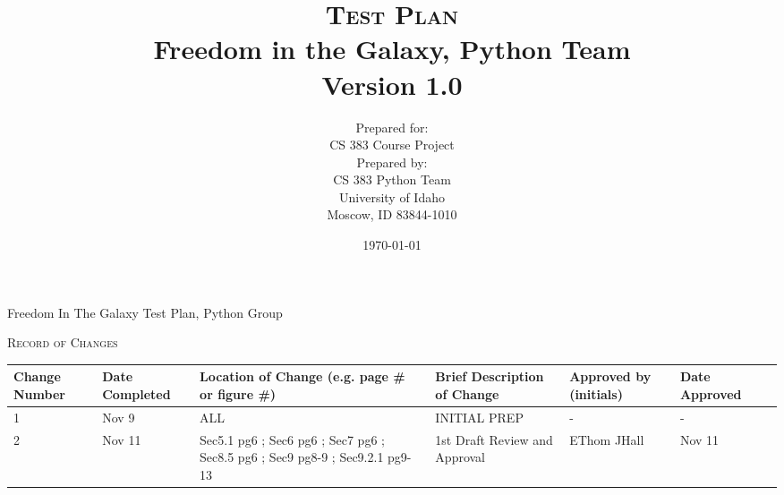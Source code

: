 \documentclass[report]{article}
\begin{document}
\title{\textsc{Test Plan}
  \\ Freedom in the Galaxy, Python Team
  \vspace{10 mm}
  \\ Version 1.0
  \vspace{10 mm}}
  
\date{\today}

\author{Prepared for:
  \\ CS 383 Course Project
  \vspace{10 mm}
  \\Prepared by:
  \\ CS 383 Python Team
  \\ University of Idaho
  \\ Moscow, ID 83844-1010
  \vspace{10 mm}}


\maketitle
\newpage 

\begin{center}
\noindent Freedom In The Galaxy Test Plan, Python Group

\vspace{10 mm}

\noindent \textsc{Record of Changes}   

\vspace{10 mm}


\begin{tabularx}{\textwidth}{| X | X | X | X | X | X | X |}
  \hline
  \textbf{Change Number} &
    \textbf{Date Completed} &
    \textbf{Location of Change (e.g. page \# or figure \#)} &
    \textbf{Brief Description of Change} &
    \textbf{Approved by (initials)} &
    \textbf{Date Approved} 
    \\ \hline 1 & Nov 9 & ALL  & INITIAL PREP & - & -
    \\ \hline 2 & Nov 11 & Sec5.1 pg6 ; Sec6 pg6 ; Sec7 pg6 ; Sec8.5 pg6 ; Sec9 pg8-9 ; Sec9.2.1 pg9-13 & 1st Draft Review and Approval & EThom JHall & Nov 11  

    \\ \hline
\end{tabularx}
\end{center}
\newpage 
\tableofcontents
\newpage
\end{document}
